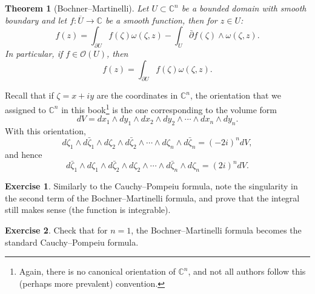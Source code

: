 \documentclass[12pt,openany]{book}
\newcommand{\C}{{\mathbb{C}}}
\newcommand{\sO}{{\mathscr{O}}}
\theoremstyle{plain}
\newtheorem{thm}{Theorem}[section]
\theoremstyle{remark}
\theoremstyle{definition}
\newenvironment{exbox}{%
    \def\FrameCommand{\vrule width 1pt \relax\hspace {10pt}}%
    \MakeFramed {\advance \hsize -\width \FrameRestore }%
}{%
    \endMakeFramed
}
\theoremstyle{exercise}
\newtheorem{exercise}{Exercise}[section]
\theoremstyle{example}
\begin{document}
\begin{thm}[Bochner--Martinelli] \label{thm:bochnermartinelli}
Let $U \subset \C^n$ be a bounded domain with smooth boundary and let
$f \colon \overline{U} \to \C$ be a smooth function,
then for $z \in U$:
\begin{equation*}
f(z) =
\int_{\partial U}
f(\zeta) \omega(\zeta,z)
-
\int_{U}
\bar{\partial} f(\zeta) \wedge \omega(\zeta,z) .
\end{equation*}
In particular, if $f \in \sO(U)$, then
\begin{equation*}
f(z) =
\int_{\partial U}
f(\zeta) \omega(\zeta,z) .
\end{equation*}
\end{thm}

Recall that if $\zeta = x+iy$ are the coordinates in $\C^n$, the orientation that we assigned to $\C^n$ in
this book\footnote{Again, there is
no canonical orientation of $\C^n$, and
not all authors follow this (perhaps more prevalent) convention.}
is the one corresponding to the volume form
\begin{equation*}
dV = dx_1 \wedge dy_1 \wedge dx_2 \wedge dy_2 \wedge \cdots \wedge dx_n \wedge dy_n .
\end{equation*}
With this orientation,
\begin{equation*}
d\zeta_1 \wedge d\bar{\zeta}_1 \wedge
d\zeta_2 \wedge d\bar{\zeta}_2 \wedge
\cdots \wedge
d\zeta_n \wedge d\bar{\zeta}_n = {(-2i)}^n dV ,
\end{equation*}
and hence
\begin{equation*}
d\bar{\zeta}_1 \wedge d\zeta_1 \wedge
d\bar{\zeta}_2 \wedge d\zeta_2 \wedge
\cdots \wedge
d\bar{\zeta}_n \wedge d\zeta_n = {(2i)}^n dV .
\end{equation*}

\begin{exbox}
\begin{exercise}
Similarly to the Cauchy--Pompeiu formula,
note the singularity in the second term of the Bochner--Martinelli formula,
and prove that the integral still makes
sense (the function is integrable).
\end{exercise}

\begin{exercise}
Check that for $n=1$, the Bochner--Martinelli formula
becomes the standard Cauchy--Pompeiu formula.
\end{exercise}
\end{exbox}
\end{document}
